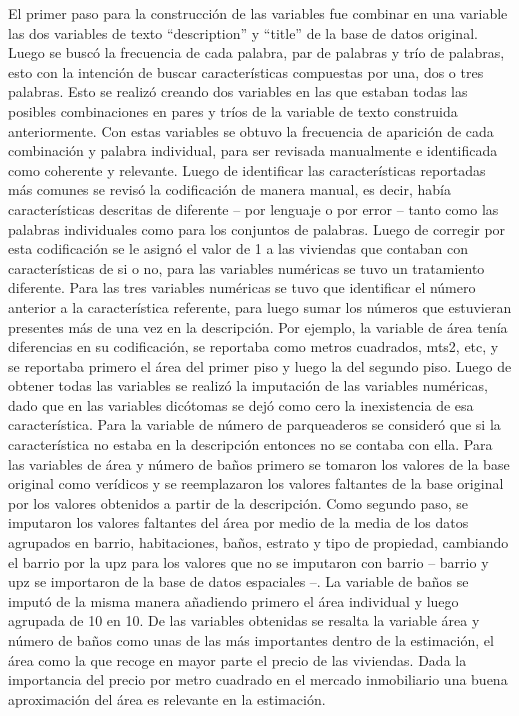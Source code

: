 \documentclass[article,11 pt]{article}
\begin{document}
 El primer paso para la construcción de las variables fue combinar en una variable las dos variables de texto “description” y “title” de la base de datos original. Luego se buscó la frecuencia de cada palabra, par de palabras y trío de palabras, esto con la intención de buscar características compuestas por una, dos o tres palabras. Esto se realizó creando dos variables en las que estaban todas las posibles combinaciones en pares y tríos de la variable de texto construida anteriormente. Con estas variables se obtuvo la frecuencia de aparición de cada combinación y palabra individual, para ser revisada manualmente e identificada como coherente y relevante. Luego de identificar las características reportadas más comunes se revisó la codificación de manera manual, es decir, había características descritas de diferente – por lenguaje o por error – tanto como las palabras individuales como para los conjuntos de palabras. Luego de corregir por esta codificación se le asignó el valor de 1 a las viviendas que contaban con características de si o no, para las variables numéricas se tuvo un tratamiento diferente. Para las tres variables numéricas se tuvo que identificar el número anterior a la característica referente, para luego sumar los números que estuvieran presentes más de una vez en la descripción. Por ejemplo, la variable de área tenía diferencias en su codificación, se reportaba como metros cuadrados, mts2, etc, y se reportaba primero el área del primer piso y luego la del segundo piso. Luego de obtener todas las variables se realizó la imputación de las variables numéricas, dado que en las variables dicótomas se dejó como cero la inexistencia de esa característica. Para la variable de número de parqueaderos se consideró que si la característica no estaba en la descripción entonces no se contaba con ella. Para las variables de área y número de baños primero se tomaron los valores de la base original como verídicos y se reemplazaron los valores faltantes de la base original por los valores obtenidos a partir de la descripción. Como segundo paso, se imputaron los valores faltantes del área por medio de la media de los datos agrupados en barrio, habitaciones, baños, estrato y tipo de propiedad, cambiando el barrio por la upz para los valores que no se imputaron con barrio – barrio y upz se importaron de la base de datos espaciales –. La variable de baños se imputó de la misma manera añadiendo primero el área individual y luego agrupada de 10 en 10. De las variables obtenidas se resalta la variable área y número de baños como unas de las más importantes dentro de la estimación, el área como la que recoge en mayor parte el precio de las viviendas. Dada la importancia del precio por metro cuadrado en el mercado inmobiliario una buena aproximación del área es relevante en la estimación.
\end{document}

